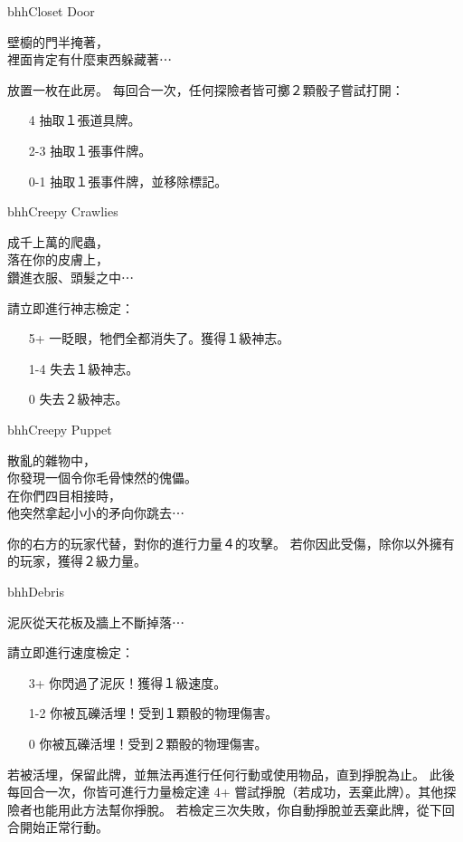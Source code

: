 \linebreak[0]%
\begin{EventCard}{bhh}{Closet Door}
  \begin{CardStory}
    壁櫥的門半掩著，\\
    裡面肯定有什麼東西躲藏著⋯
  \end{CardStory}
  放置一枚在此房。\smallbreak
  每回合一次，任何探險者皆可擲２顆骰子嘗試打開：
  \begin{itemize}
    \item[4] 抽取１張道具牌。
    \item[2-3] 抽取１張事件牌。
    \item[0-1] 抽取１張事件牌，並移除標記。
  \end{itemize}
\end{EventCard}%
\linebreak[0]%
\begin{EventCard}{bhh}{Creepy Crawlies}
  \begin{CardStory}
    成千上萬的爬蟲，\\
    落在你的皮膚上，\\
    鑽進衣服、頭髮之中⋯
  \end{CardStory}
  請立即進行神志檢定：
  \begin{itemize}
    \item[5+] 一眨眼，牠們全都消失了。獲得１級神志。
    \item[1-4] 失去１級神志。
    \item[0] 失去２級神志。
  \end{itemize}
\end{EventCard}%
\linebreak[0]%
\begin{EventCard}{bhh}{Creepy Puppet}
  \begin{CardStory}
    散亂的雜物中，\\
    你發現一個令你毛骨悚然的傀儡。\\
    在你們四目相接時，\\
    他突然拿起小小的矛向你跳去⋯
  \end{CardStory}
  你的右方的玩家代替\ThisName{}，對你的進行力量４的攻擊。\smallbreak
  若你因此受傷，除你以外擁有的玩家，獲得２級力量。\smallbreak
\end{EventCard}%
\linebreak[0]%
\begin{EventCard}{bhh}{Debris}
  \begin{CardStory}
    泥灰從天花板及牆上不斷掉落⋯
  \end{CardStory}
  \footnotesize
  請立即進行速度檢定：
  \begin{itemize}
    \item[3+] 你閃過了泥灰！獲得１級速度。
    \item[1-2] 你被瓦礫活埋！受到１顆骰的物理傷害。
    \item[0] 你被瓦礫活埋！受到２顆骰的物理傷害。
  \end{itemize}
  若被活埋，保留此牌，並無法再進行任何行動或使用物品，直到掙脫為止。\smallbreak
  此後每回合一次，你皆可進行力量檢定達 4+ 嘗試掙脫（若成功，丟棄此牌）。其他探險者也能用此方法幫你掙脫。\smallbreak
  若檢定三次失敗，你自動掙脫並丟棄此牌，從下回合開始正常行動。\smallbreak
\end{EventCard}%
